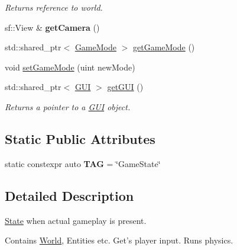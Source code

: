\begin{DoxyCompactItemize}
\begin{DoxyCompactList}\small\item\em Returns reference to world. \end{DoxyCompactList}\item 
\hypertarget{classGameState_a45607b8a0473073090740500826268c0}{sf\-::\-View \& {\bfseries get\-Camera} ()}\label{classGameState_a45607b8a0473073090740500826268c0}

\item 
std\-::shared\-\_\-ptr$<$ \hyperlink{classGameMode}{Game\-Mode} $>$ \hyperlink{classGameState_a20ec39ca6754c9a78e5142772208b1a6}{get\-Game\-Mode} ()
\item 
void \hyperlink{classGameState_a78d102a871c42f92805105b3a4783932}{set\-Game\-Mode} (uint new\-Mode)
\item 
\hypertarget{classGameState_a64c8327f5ca1d060867381ecfbfd81c3}{std\-::shared\-\_\-ptr$<$ \hyperlink{classGUI}{G\-U\-I} $>$ \hyperlink{classGameState_a64c8327f5ca1d060867381ecfbfd81c3}{get\-G\-U\-I} ()}\label{classGameState_a64c8327f5ca1d060867381ecfbfd81c3}

\begin{DoxyCompactList}\small\item\em Returns a pointer to a \hyperlink{classGUI}{G\-U\-I} object. \end{DoxyCompactList}\end{DoxyCompactItemize}
\subsection*{Static Public Attributes}
\begin{DoxyCompactItemize}
\item 
\hypertarget{classGameState_a22e7fe397c8c5e5a687d06a68515a877}{static constexpr auto {\bfseries T\-A\-G} = \char`\"{}Game\-State\char`\"{}}\label{classGameState_a22e7fe397c8c5e5a687d06a68515a877}

\end{DoxyCompactItemize}


\subsection{Detailed Description}
\hyperlink{classState}{State} when actual gameplay is present. 

Contains \hyperlink{classWorld}{World}, Entities etc. Get's player input. Runs physics. 

